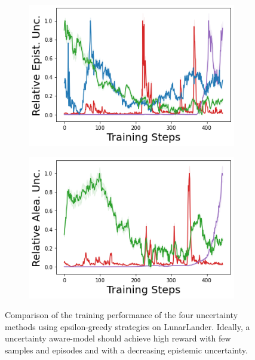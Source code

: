 \begin{figure}
\begin{subfigure}{.245\textwidth}
    \end{subfigure}
    \begin{subfigure}{.245\textwidth}
        \includegraphics[width=\textwidth]{sections/011_icml2022/resources/lunarlander-training_epistemic_uncertainty-training-model.png}
    \end{subfigure}
    \begin{subfigure}{.245\textwidth}
        \includegraphics[width=\textwidth]{sections/011_icml2022/resources/lunarlander-training_aleatoric_ucertainty-training-model.png}  
    \end{subfigure}
    \caption{Comparison of the training performance of the four uncertainty methods using epsilon-greedy strategies on LunarLander. Ideally, a uncertainty aware-model should achieve high reward  with few samples and episodes and with a decreasing epistemic uncertainty.}
    \label{fig:model-training-performance-lunarlander}
\end{figure}